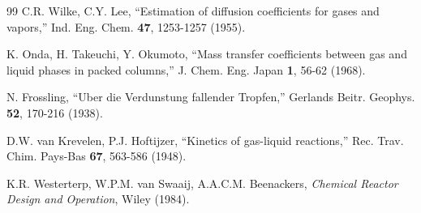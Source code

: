 \documentclass[11pt,a4paper]{article}
\begin{document}
\begin{thebibliography}{99}
C.R. Wilke, C.Y. Lee, ``Estimation of diffusion coefficients for gases and vapors,'' Ind. Eng. Chem. \textbf{47}, 1253-1257 (1955).

K. Onda, H. Takeuchi, Y. Okumoto, ``Mass transfer coefficients between gas and liquid phases in packed columns,'' J. Chem. Eng. Japan \textbf{1}, 56-62 (1968).

N. Frossling, ``Uber die Verdunstung fallender Tropfen,'' Gerlands Beitr. Geophys. \textbf{52}, 170-216 (1938).

D.W. van Krevelen, P.J. Hoftijzer, ``Kinetics of gas-liquid reactions,'' Rec. Trav. Chim. Pays-Bas \textbf{67}, 563-586 (1948).

K.R. Westerterp, W.P.M. van Swaaij, A.A.C.M. Beenackers, \textit{Chemical Reactor Design and Operation}, Wiley (1984).

\end{thebibliography}
\end{document}
